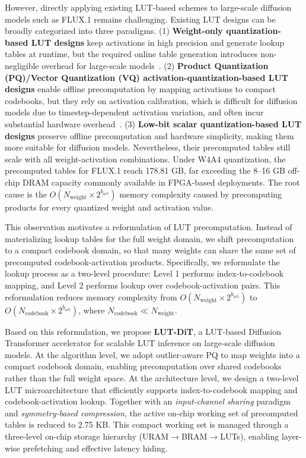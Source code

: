 However, directly applying existing LUT-based schemes to large-scale diffusion models such as FLUX.1 remains challenging. Existing LUT designs can be broadly categorized into three paradigms. (1) \textbf{Weight-only quantization-based LUT designs} keep activations in high precision and generate lookup tables at runtime, but the required online table generation introduces non-negligible overhead for large-scale models~\cite{lut-gemm,t-mac,luttensorcore,localut}. (2) \textbf{Product Quantization (PQ)/Vector Quantization (VQ) activation-quantization-based LUT designs} enable offline precomputation by mapping activations to compact codebooks, but they rely on activation calibration, which is difficult for diffusion models due to timestep-dependent activation variation, and often incur substantial hardware overhead~\cite{pqa,maddness,pim-dl,pecan,lut-nn,lut-dla}. (3) \textbf{Low-bit scalar quantization-based LUT designs} preserve offline precomputation and hardware simplicity, making them more suitable for diffusion models. Nevertheless, their precomputed tables still scale with all weight-activation combinations. Under W4A4 quantization, the precomputed tables for FLUX.1 reach 178.81 GB, far exceeding the 8--16 GB off-chip DRAM capacity commonly available in FPGA-based deployments. The root cause is the $O(N_{\text{weight}} \times 2^{b_{\text{act}}})$ memory complexity caused by precomputing products for every quantized weight and activation value.

This observation motivates a reformulation of LUT precomputation. Instead of materializing lookup tables for the full weight domain, we shift precomputation to a compact codebook domain, so that many weights can share the same set of precomputed codebook-activation products. Specifically, we reformulate the lookup process as a two-level procedure: Level 1 performs index-to-codebook mapping, and Level 2 performs lookup over codebook-activation pairs. This reformulation reduces memory complexity from $O(N_{\text{weight}} \times 2^{b_{\text{act}}})$ to $O(N_{\text{codebook}} \times 2^{b_{\text{act}}})$, where $N_{\text{codebook}} \ll N_{\text{weight}}$.

Based on this reformulation, we propose \textbf{LUT-DiT}, a LUT-based Diffusion Transformer accelerator for scalable LUT inference on large-scale diffusion models. At the algorithm level, we adopt outlier-aware PQ to map weights into a compact codebook domain, enabling precomputation over shared codebooks rather than the full weight space. At the architecture level, we design a two-level LUT microarchitecture that efficiently supports index-to-codebook mapping and codebook-activation lookup. Together with an \textit{input-channel sharing} paradigm and \textit{symmetry-based compression}, the active on-chip working set of precomputed tables is reduced to 2.75 KB. This compact working set is managed through a three-level on-chip storage hierarchy (URAM$\rightarrow$BRAM$\rightarrow$LUTs), enabling layer-wise prefetching and effective latency hiding.

